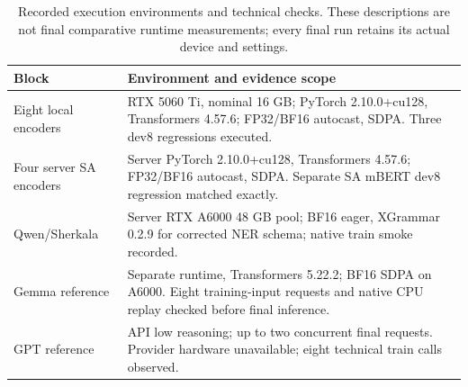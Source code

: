 \begin{table}[t]
\caption{Recorded execution environments and technical checks. These descriptions are not final comparative runtime measurements; every final run retains its actual device and settings.}
\label{tab:compute}
\centering\footnotesize
\begin{tabular}{@{}p{34mm}p{125mm}@{}}
\toprule
Block & {\raggedright Environment and evidence scope\par}\\
\midrule
Eight local encoders & {\raggedright RTX 5060 Ti, nominal 16 GB; PyTorch 2.10.0+cu128, Transformers 4.57.6; FP32/BF16 autocast, SDPA. Three dev8 regressions executed.\par}\\
Four server SA encoders & {\raggedright Server PyTorch 2.10.0+cu128, Transformers 4.57.6; FP32/BF16 autocast, SDPA. Separate SA mBERT dev8 regression matched exactly.\par}\\
Qwen/Sherkala & {\raggedright Server RTX A6000 48 GB pool; BF16 eager, XGrammar 0.2.9 for corrected NER schema; native train smoke recorded.\par}\\
Gemma reference & {\raggedright Separate runtime, Transformers 5.22.2; BF16 SDPA on A6000. Eight training-input requests and native CPU replay checked before final inference.\par}\\
GPT reference & {\raggedright API low reasoning; up to two concurrent final requests. Provider hardware unavailable; eight technical train calls observed.\par}\\
\bottomrule
\end{tabular}
\end{table}
